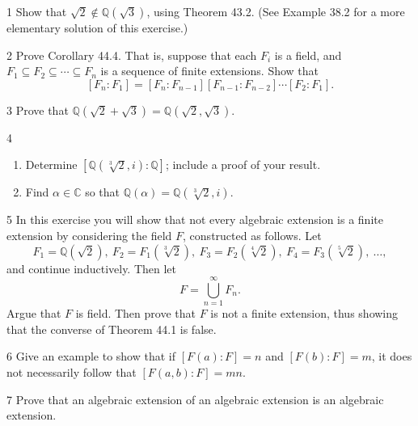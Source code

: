 \begin{problem}{1}
    Show that $\sqrt{2} \notin \mathbb{Q}(\sqrt{3})$, using Theorem 43.2. (See
    Example 38.2 for a more elementary solution of this exercise.)
\end{problem}
\unsolved

\begin{problem}{2}
    Prove Corollary 44.4. That is, suppose that each $F_i$ is a field, and
    $F_1 \subseteq F_2 \subseteq \cdots \subseteq F_n$ is a sequence of finite extensions.
    Show that
    \[[F_n : F_1] = [F_n : F_{n - 1}][F_{n - 1} : F_{n - 2}] \cdots [F_2 : F_1].\]
\end{problem}
\unsolved

\begin{problem}{3}
    Prove that $\mathbb{Q}(\sqrt{2} + \sqrt{3}) = \mathbb{Q}(\sqrt{2}, \sqrt{3})$.
\end{problem}
\unsolved

\begin{problem}{4}
    \begin{enumerate}
        \item[(a)] Determine $[\mathbb{Q}(\sqrt[3]{2}, i) : \mathbb{Q}]$; include a proof
        of your result.
        \item[(b)] Find $\alpha \in \mathbb{C}$ so that
        $\mathbb{Q}(\alpha) = \mathbb{Q}(\sqrt[3]{2}, i)$.
    \end{enumerate}
\end{problem}
\unsolved

\begin{problem}{5}
    In this exercise you will show that not every algebraic extension is a finite
    extension by considering the field $F$, constructed as follows. Let
    \[F_1 = \mathbb{Q}(\sqrt{2}),\ F_2 = F_1(\sqrt[3]{2}),\ F_3 = F_2(\sqrt[4]{2}),\
    F_4 = F_3(\sqrt[5]{2}),\ \ldots,\]
    and continue inductively. Then let
    \[F = \bigcup_{n = 1}^{\infty} F_n.\]
    Argue that $F$ is field. Then prove that $F$ is not a finite extension, thus showing
    that the converse of Theorem 44.1 is false.
\end{problem}
\unsolved

\begin{problem}{6}
    Give an example to show that if $[F(a) : F] = n$ and $[F(b) : F] = m$, it does not
    necessarily follow that $[F(a, b) : F] = mn$.
\end{problem}
\unsolved

\begin{problem}{7}
    Prove that an algebraic extension of an algebraic extension is an algebraic extension.
\end{problem}
\unsolved

